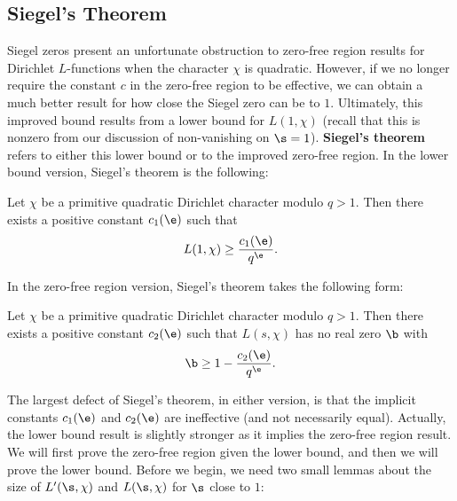     \subsection*{Siegel's Theorem}
      Siegel zeros present an unfortunate obstruction to zero-free region results for Dirichlet $L$-functions when the character $\chi$ is quadratic. However, if we no longer require the constant $c$ in the zero-free region to be effective, we can obtain a much better result for how close the Siegel zero can be to $1$. Ultimately, this improved bound results from a lower bound for $L(1,\chi)$ (recall that this is nonzero from our discussion of non-vanishing on $\s = 1$). \textbf{Siegel's theorem} refers to either this lower bound or to the improved zero-free region. In the lower bound version, Siegel's theorem is the following:

      \begin{theorem}
        Let $\chi$ be a primitive quadratic Dirichlet character modulo $q > 1$. Then there exists a positive constant $c_{1}(\e)$ such that
        \[
          L(1,\chi) \ge \frac{c_{1}(\e)}{q^{\e}}.
        \]
      \end{theorem}

      In the zero-free region version, Siegel's theorem takes the following form:

      \begin{theorem}
        Let $\chi$ be a primitive quadratic Dirichlet character modulo $q > 1$. Then there exists a positive constant $c_{2}(\e)$ such that $L(s,\chi)$ has no real zero $\b$ with
        \[
          \b \ge 1-\frac{c_{2}(\e)}{q^{\e}}.
        \]
      \end{theorem}

      The largest defect of Siegel's theorem, in either version, is that the implicit constants $c_{1}(\e)$ and $c_{2}(\e)$ are ineffective (and not necessarily equal). Actually, the lower bound result is slightly stronger as it implies the zero-free region result. We will first prove the zero-free region given the lower bound, and then we will prove the lower bound. Before we begin, we need two small lemmas about the size of $L'(\s,\chi)$ and $L(\s,\chi)$ for $\s$ close to $1$:

